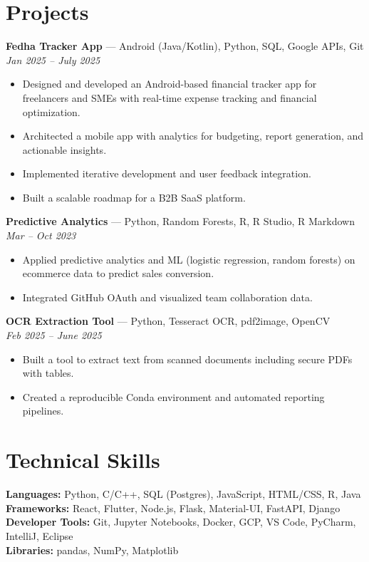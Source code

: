 \documentclass[11pt,a4paper]{article}
\begin{document}
\section*{Projects}
\textbf{Fedha Tracker App} — Android (Java/Kotlin), Python, SQL, Google APIs, Git \\
\textit{Jan 2025 – July 2025}
\begin{itemize}[leftmargin=*]
    \item Designed and developed an Android-based financial tracker app for freelancers and SMEs with real-time expense tracking and financial optimization.
    \item Architected a mobile app with analytics for budgeting, report generation, and actionable insights.
    \item Implemented iterative development and user feedback integration.
    \item Built a scalable roadmap for a B2B SaaS platform.
\end{itemize}

\textbf{Predictive Analytics} — Python, Random Forests, R, R Studio, R Markdown \\
\textit{Mar – Oct 2023}
\begin{itemize}[leftmargin=*]
    \item Applied predictive analytics and ML (logistic regression, random forests) on ecommerce data to predict sales conversion.
    \item Integrated GitHub OAuth and visualized team collaboration data.
\end{itemize}

\textbf{OCR Extraction Tool} — Python, Tesseract OCR, pdf2image, OpenCV \\
\textit{Feb 2025 – June 2025}
\begin{itemize}[leftmargin=*]
    \item Built a tool to extract text from scanned documents including secure PDFs with tables.
    \item Created a reproducible Conda environment and automated reporting pipelines.
\end{itemize}

\section*{Technical Skills}
\textbf{Languages:} Python, C/C++, SQL (Postgres), JavaScript, HTML/CSS, R, Java \\
\textbf{Frameworks:} React, Flutter, Node.js, Flask, Material-UI, FastAPI, Django \\
\textbf{Developer Tools:} Git, Jupyter Notebooks, Docker, GCP, VS Code, PyCharm, IntelliJ, Eclipse \\
\textbf{Libraries:} pandas, NumPy, Matplotlib
\end{document}
